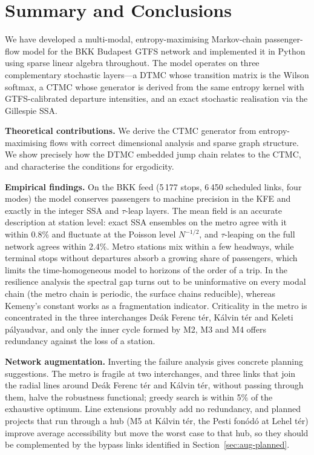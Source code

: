 \documentclass[12pt,a4paper]{article}
\theoremstyle{plain}
\theoremstyle{definition}
\theoremstyle{remark}
\begin{document}
\section{Summary and Conclusions}
\label{sec:conclusion}

We have developed a multi-modal, entropy-maximising Markov-chain
passenger-flow model for the BKK Budapest GTFS network and implemented it in
Python using sparse linear algebra throughout.  The model operates on three
complementary stochastic layers---a DTMC whose transition matrix is the Wilson
softmax, a CTMC whose generator is derived from the same entropy kernel with
GTFS-calibrated departure intensities, and an exact stochastic realisation via
the Gillespie SSA.

\textbf{Theoretical contributions.}  We derive the
CTMC generator from entropy-maximising flows with correct dimensional analysis
and sparse graph structure.  We show precisely how the DTMC embedded jump chain
relates to the CTMC, and characterise the conditions for ergodicity.

\textbf{Empirical findings.}  On the BKK feed (5\,177 stops, 6\,450 scheduled
links, four modes) the model conserves passengers to machine precision in the
KFE and exactly in the integer SSA and $\tau$-leap layers.  The mean field is an
accurate description at station level: exact SSA ensembles on the metro agree
with it within 0.8\% and fluctuate at the Poisson level $N^{-1/2}$, and
$\tau$-leaping on the full network agrees within 2.4\%.  Metro stations mix
within a few headways, while terminal stops without departures absorb a growing
share of passengers, which limits the time-homogeneous model to horizons of the
order of a trip.  In the resilience analysis the spectral gap turns out to be
uninformative on every modal chain (the metro chain is periodic, the surface
chains reducible), whereas Kemeny's constant works as a fragmentation
indicator.  Criticality in the metro is concentrated in the three interchanges
De\'ak Ferenc t\'er, K\'alvin t\'er and Keleti p\'alyaudvar, and only the inner
cycle formed by M2, M3 and M4 offers redundancy against the loss of a station.

\textbf{Network augmentation.}  Inverting the failure analysis gives concrete
planning suggestions.  The metro is fragile at two interchanges, and three links
that join the radial lines around De\'ak Ferenc t\'er and K\'alvin t\'er,
without passing through them, halve the robustness functional; greedy search
is within 5\% of the exhaustive optimum.  Line extensions provably add no
redundancy, and planned projects that run through a hub (M5 at K\'alvin t\'er,
the Pesti fonód\'o at Lehel t\'er) improve average accessibility but move the
worst case to that hub, so they should be complemented by the bypass links
identified in Section~\ref{sec:aug-planned}.
\end{document}
